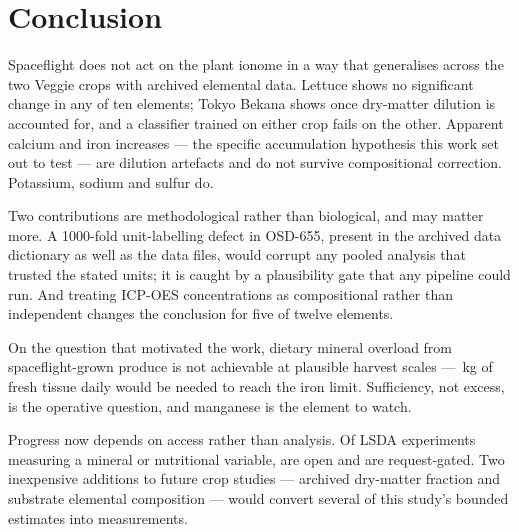 \section{Conclusion}

Spaceflight does not act on the plant ionome in a way that generalises across
the two Veggie crops with archived elemental data. Lettuce shows no significant
change in any of ten elements; Tokyo Bekana shows \NSigCLR{} once dry-matter
dilution is accounted for, and a classifier trained on either crop fails on the
other. Apparent calcium and iron increases --- the specific accumulation
hypothesis this work set out to test --- are dilution artefacts and do not
survive compositional correction. Potassium, sodium and sulfur do.

Two contributions are methodological rather than biological, and may matter
more. A 1000-fold unit-labelling defect in OSD-655, present in the archived
data dictionary as well as the data files, would corrupt any pooled analysis
that trusted the stated units; it is caught by a plausibility gate that any
pipeline could run. And treating ICP-OES concentrations as compositional rather
than independent changes the conclusion for five of twelve elements.

On the question that motivated the work, dietary mineral overload from
spaceflight-grown produce is not achievable at plausible harvest scales ---
\OverloadFeLet\,kg of fresh tissue daily would be needed to reach the iron
limit. Sufficiency, not excess, is the operative question, and manganese is the
element to watch.

Progress now depends on access rather than analysis. Of \LSDAMeasured{} LSDA
experiments measuring a mineral or nutritional variable, \LsdaaccessOpen{} are
open and \LsdaaccessRequestrequired{} are request-gated. Two inexpensive
additions to future crop studies --- archived dry-matter fraction and substrate
elemental composition --- would convert several of this study's bounded
estimates into measurements.
